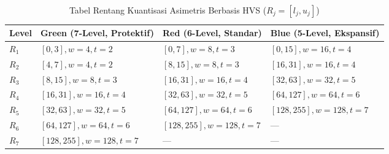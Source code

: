 \documentclass[12pt,journal]{IEEEtran}
\begin{document}
\begin{table}[t]
\centering
\caption{Tabel Rentang Kuantisasi Asimetris Berbasis HVS ($R_j = [l_j, u_j]$)}
\label{tab:range_tables}
\footnotesize
\begin{tabular}{@{}llll@{}}
\toprule
Level & Green (7-Level, Protektif) & Red (6-Level, Standar) & Blue (5-Level, Ekspansif) \\
\midrule
$R_1$ & $[0, 3], w=4, t=2$     & $[0, 7], w=8, t=3$     & $[0, 15], w=16, t=4$ \\
$R_2$ & $[4, 7], w=4, t=2$     & $[8, 15], w=8, t=3$    & $[16, 31], w=16, t=4$ \\
$R_3$ & $[8, 15], w=8, t=3$    & $[16, 31], w=16, t=4$  & $[32, 63], w=32, t=5$ \\
$R_4$ & $[16, 31], w=16, t=4$  & $[32, 63], w=32, t=5$  & $[64, 127], w=64, t=6$ \\
$R_5$ & $[32, 63], w=32, t=5$  & $[64, 127], w=64, t=6$ & $[128, 255], w=128, t=7$ \\
$R_6$ & $[64, 127], w=64, t=6$ & $[128, 255], w=128, t=7$ & --- \\
$R_7$ & $[128, 255], w=128, t=7$ & ---                  & --- \\
\bottomrule
\end{tabular}
\end{table}
\end{document}
